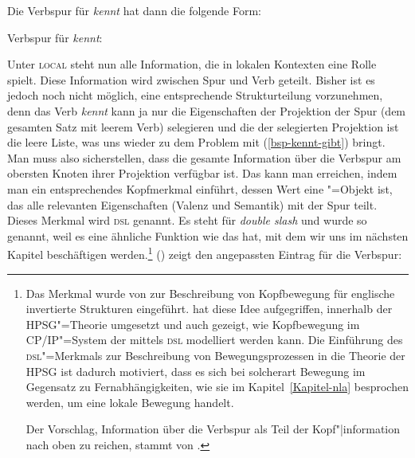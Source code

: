\noindent
Die Verbspur für \emph{kennt} hat dann die folgende Form:

\eas
\label{le-verbspur-kennt-ohne-dsl}%
Verbspur für \emph{kennt}:\\\samepage
{}
\zs

\noindent
Unter \textsc{local} steht nun alle Information, die in lokalen Kontexten eine Rolle spielt.
Diese Information wird zwischen Spur und Verb geteilt. Bisher ist es jedoch noch nicht möglich,
eine entsprechende Strukturteilung vorzunehmen, denn das Verb \emph{kennt} kann ja nur
die Eigenschaften der Projektion der Spur (dem gesamten Satz mit leerem Verb) selegieren und die \compsl der selegierten
Projektion ist die leere Liste, was uns wieder zu dem Problem mit (\ref{bsp-kennt-gibt}) bringt. Man
muss also sicherstellen, dass die gesamte Information über die Verbspur am obersten Knoten
ihrer Projektion verfügbar ist. Das kann man erreichen, indem man ein entsprechendes Kopfmerkmal
einführt, dessen Wert eine \local"=Objekt ist, das alle relevanten Eigenschaften (Valenz und
Semantik) mit der Spur teilt. Dieses Merkmal wird \textsc{dsl} genannt. Es steht für \emph{double
  slash} und wurde so genannt, weil es eine ähnliche Funktion wie das \slashm hat, mit dem wir uns
im nächsten Kapitel beschäftigen werden.\footnote{%
  Das Merkmal \dsl wurde von \citet*{Jacobson87} zur Beschreibung von Kopfbewegung 
  für englische invertierte Strukturen eingeführt. \citet{Borsley89}
  hat diese Idee aufgegriffen, innerhalb der HPSG"=Theorie umgesetzt und 
  auch gezeigt, wie Kopfbewegung im CP/IP"=System der \gbt mittels \textsc{dsl} modelliert werden
  kann.
  Die Einführung des \textsc{dsl}"=Merkmals zur Beschreibung von Bewegungsprozessen
  in die Theorie der HPSG ist dadurch motiviert, dass es sich bei solcherart Bewegung
  im Gegensatz zu Fernabhängigkeiten, wie sie im Kapitel~\ref{Kapitel-nla}
  besprochen werden, um eine lokale Bewegung handelt.

  Der Vorschlag, Information über die Verbspur als Teil der Kopf"|information nach oben zu reichen,
  stammt von \citet[]{Oliva92b}.%
}
() zeigt den angepassten Eintrag für die Verbspur:

